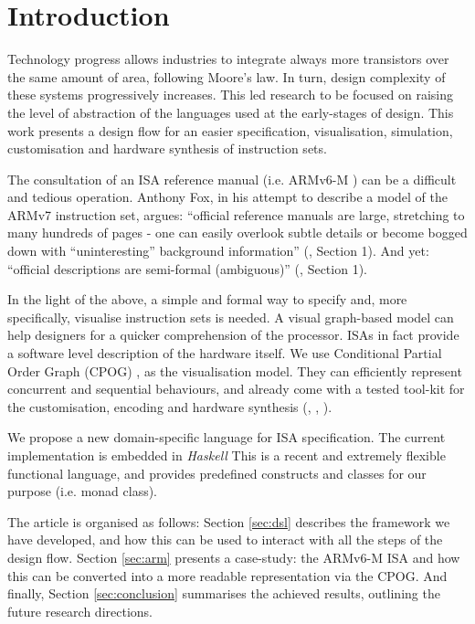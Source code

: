 \documentclass[conference]{IEEEtran}
\begin{document}
\IEEEpeerreviewmaketitle


\section{Introduction}
\label{sec:intro}
Technology progress allows industries to integrate always more transistors over the
same amount of area, following Moore's law. In turn, design complexity of these
systems progressively increases. This led research to be focused on raising the
level of abstraction of the languages used at the early-stages of design. This work
presents a design flow for an easier specification, visualisation, simulation,
customisation and hardware synthesis of instruction sets.

The consultation of an ISA reference manual (i.e. ARMv6-M \cite{armManual}) can be
a difficult and tedious operation. Anthony Fox, in his attempt to describe a model
of the ARMv7 instruction set, argues: ``official reference manuals are large,
stretching to many hundreds of pages - one can easily overlook subtle details or
become bogged down with ``uninteresting'' background information'' (\cite{armv7},
Section 1). And yet: ``official descriptions are semi-formal (ambiguous)''
(\cite{armv7}, Section 1). 

In the light of the above, a simple and formal way to specify and, more
specifically, visualise instruction sets is needed. A visual graph-based model can
help designers for a quicker comprehension of the processor. ISAs in fact provide a
software level description of the hardware itself. We use Conditional Partial Order
Graph (CPOG) \cite{cpog},\cite{andreyPhd} as the visualisation model. They can
efficiently represent concurrent and sequential behaviours, and already come with a
tested tool-kit for the customisation, encoding and hardware synthesis
(\cite{workcraft}, \cite{satEncoding}, \cite{acsd}).

We propose a new domain-specific language for ISA specification. The current
implementation is embedded in \textit{Haskell} This is a recent and extremely
flexible functional language, and provides predefined constructs and classes for
our purpose (i.e. monad class).

The article is organised as follows: Section \ref{sec:dsl} describes the framework
we have developed, and how this can be used to interact with all the steps of the 
design flow. Section \ref{sec:arm} presents a case-study: the ARMv6-M ISA and how this
can be converted into a more readable representation via the CPOG. 
And finally, Section \ref{sec:conclusion} summarises the achieved results, 
outlining the future research directions.
\end{document}
